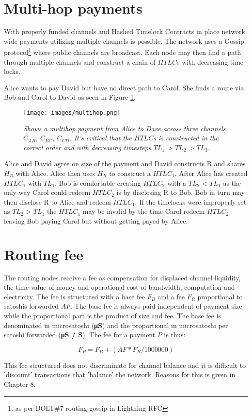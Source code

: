 \section{Multi-hop payments} 

With properly funded channels and Hashed Timelock Contracts in place network wide payments utilizing multiple channels is possible.
The network uses a Gossip protocol\footnote{as per BOLT\#7 routing-gossip in Lightning RFC\cite{repository:lightning:rfc}} where
public channels are broadcast. Each \gls{node} may then find a path through multiple channels and construct a chain of $HTLC$s with decreasing time locks.

Alice wants to pay David but have no direct path to Carol. She finds a route via Bob and Carol to David as seen in Figure \ref{fig:multihop}.

\begin{figure}[!htb]

	\centering
	\texttt{[image: images/multihop.png]}

	\caption{\textit{
			Shows a multihop payment from Alice to Dave across three channels $C_{AB}$, $C_{BC}$, $C_{CD}$. It's critical that the $HTLC$s is constructed in the correct order and with decreasing timesteps $TL_{1}$ > $TL_{2}$ > $TL_{3}$.
		}}
	\label{fig:multihop}

\end{figure}

Alice and David agree on size of the payment and David constructs R and shares $H_{R}$ with Alice. Alice then uses $H_{R}$ to construct a $HTLC_{1}$.
After Alice has created $HTLC_{1}$ with $TL_{1}$, Bob is comfortable creating $HTLC_{2}$ with a $TL_{2}$ < $TL_{1}$ as the only way Carol could redeem $HTLC_{2}$ is by disclosing R to Bob. Bob in turn may then disclose R to Alice and redeem $HTLC_{1}$. If the timelocks were improperly set as $TL_{2}$ > $TL_{1}$ the $HTLC_{1}$ may be invalid by the time Carol redeem $HTLC_{2}$ leaving Bob paying Carol but without getting payed by Alice.

\section{Routing fee}

The routing \gls{node}s receive a fee as compensation for displaced channel liquidity, the time value of money and operational cost of bandwidth, computation and electricity. The fee is structured with a base fee $F_{B}$ and a fee $F_{R}$ proportional to satoshis forwarded $AF$. The base fee is always paid independent of payment size while the proportional part is the product of size and fee. The base fee is denominated in microsatoshi (\textbf{μS}) and the proportional in microsatoshi per satoshi forwarded (\textbf{μS / S}). The fee for a payment $P$ is thus:

\[ F_{P} = F_{B} + (AF * F_{R} / 1000000) \]

This fee structured does not discriminate for channel balance and it is difficult to 'discount' transactions that 'balance' the network. Reasons for this is given in Chapter 8.  
